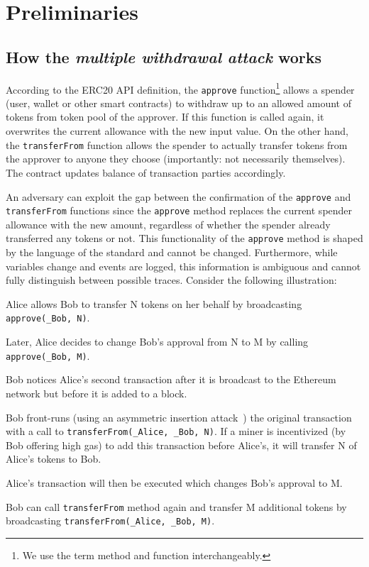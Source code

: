 
\section{Preliminaries}

\subsection{How the \textit{multiple withdrawal attack} works}

According to the ERC20 API definition, the \texttt{approve} function\footnote{We use the term method and function interchangeably.}
allows a spender (\eg user, wallet or other smart contracts) to withdraw up to an allowed amount of tokens from token pool of the approver. If this function is called again, it overwrites the current allowance with the new input value. On the other hand, the \texttt{transferFrom} function allows the spender to actually transfer tokens from the approver to anyone they choose (importantly: not necessarily themselves). The contract updates balance of transaction parties accordingly. 

An adversary can exploit the gap between the confirmation of the \texttt{approve} and \texttt{transferFrom} functions since the \texttt{approve} method replaces the current spender allowance with the new amount, regardless of whether the spender already transferred any tokens or not. This functionality of the \texttt{approve} method is shaped by the language of the standard and cannot be changed. Furthermore, while variables change and events are logged, this information is ambiguous and cannot fully distinguish between possible traces. Consider the following illustration:

\begin{compactlistn}
	\item Alice allows Bob to transfer N tokens on her behalf by broadcasting \texttt{approve(\_Bob, N)}.
	\item Later, Alice decides to change Bob's approval from N to M  by calling \texttt{approve(\_Bob, M)}.
	\item Bob notices Alice's second transaction after it is broadcast to the Ethereum network but before it is added to a block.
	\item Bob front-runs (using an asymmetric insertion attack~\cite{eskandari2019sok}) the original transaction with a call to   \texttt{transferFrom(\_Alice, \_Bob, N)}. If a miner is incentivized (\eg by Bob offering high gas) to add this transaction before Alice's, it will transfer N of Alice's tokens to Bob.
	\item Alice's transaction will then be executed which changes Bob's approval to M.
	\item Bob can call \texttt{transferFrom} method again and transfer M additional tokens by broadcasting \texttt{transferFrom(\_Alice, \_Bob, M)}.
\end{compactlistn}

